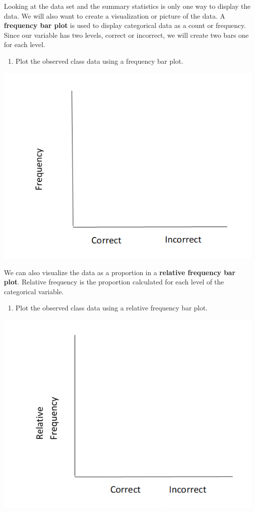 \documentclass[
]{article}
\providecommand{\tightlist}{%
  \setlength{\itemsep}{0pt}\setlength{\parskip}{0pt}}
\begin{document}
Looking at the data set and the summary statistics is only one way to
display the data. We will also want to create a visualization or picture
of the data. A \textbf{frequency bar plot} is used to display
categorical data as a count or frequency. Since our variable has two
levels, correct or incorrect, we will create two bars one for each
level.

\newpage

\begin{enumerate}
\def\labelenumi{\arabic{enumi}.}
\setcounter{enumi}{6}
\tightlist
\item
  Plot the observed class data using a frequency bar plot.
\end{enumerate}

\includegraphics{../images/barplot_martian.png}

We can also visualize the data as a proportion in a \textbf{relative
frequency bar plot}. Relative frequency is the proportion calculated for
each level of the categorical variable.

\begin{enumerate}
\def\labelenumi{\arabic{enumi}.}
\setcounter{enumi}{7}
\tightlist
\item
  Plot the observed class data using a relative frequency bar plot.
\end{enumerate}

\includegraphics{../images/relative_barplot_martian.png}
\end{document}
